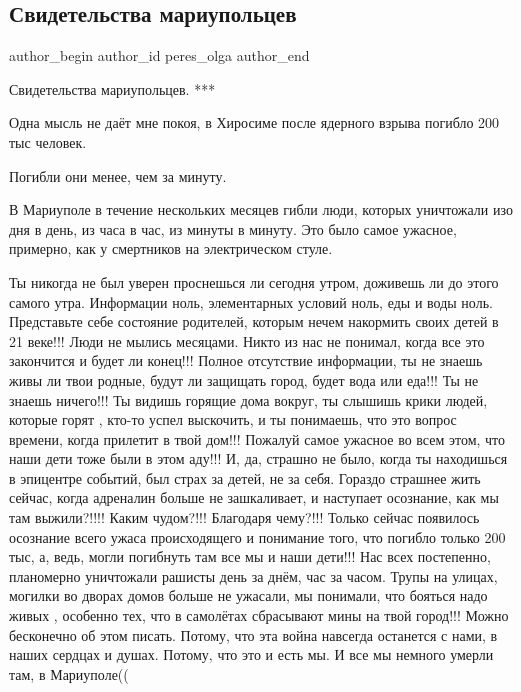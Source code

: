 
 
 
 
 

\subsection{Свидетельства  мариупольцев}
\label{sec:27_01_2023.fb.peres_olga.1.svidetelstva__mariup}

\ifcmt
 author_begin
   author_id peres_olga
 author_end
\fi

Свидетельства мариупольцев.
***

Одна мысль не даёт мне покоя, в Хиросиме после ядерного взрыва погибло 200 тыс
человек. 

Погибли они менее, чем за минуту. 

В Мариуполе в течение нескольких месяцев гибли люди, которых уничтожали изо
дня в день, из часа в час, из минуты в минуту. Это было самое ужасное,
примерно, как у смертников на электрическом стуле. 

Ты никогда не был уверен проснешься ли сегодня утром, доживешь ли до этого
самого утра. Информации ноль, элементарных условий ноль, еды и воды ноль.
Представьте себе состояние родителей, которым нечем накормить своих детей в 21
веке!!! Люди не мылись месяцами. Никто из нас не понимал, когда все это
закончится и будет ли конец!!! Полное отсутствие информации, ты не знаешь живы
ли твои родные, будут ли защищать город, будет вода или еда!!! Ты не знаешь
ничего!!! Ты видишь горящие дома вокруг, ты слышишь крики людей, которые горят
, кто-то успел выскочить, и ты понимаешь, что это вопрос времени, когда
прилетит в твой дом!!! Пожалуй самое ужасное во всем этом, что наши дети тоже
были в этом аду!!! И, да, страшно не было, когда ты находишься в эпицентре
событий, был страх за детей, не за себя. Гораздо страшнее жить сейчас, когда
адреналин больше не зашкаливает, и наступает осознание, как мы там
выжили?!!!! Каким чудом?!!! Благодаря чему?!!! Только сейчас появилось
осознание всего ужаса происходящего и понимание того, что погибло только 200
тыс, а, ведь, могли погибнуть там все мы и наши дети!!! Нас всех постепенно,
планомерно уничтожали рашисты день за днём, час за часом. Трупы на улицах,
могилки во дворах домов больше не ужасали, мы понимали, что бояться надо живых
, особенно тех, что в самолётах сбрасывают мины на твой город!!! Можно
бесконечно об этом писать. Потому, что эта война навсегда останется с нами, в
наших сердцах и душах. Потому, что это и есть мы. И все мы немного умерли там,
в Мариуполе((

